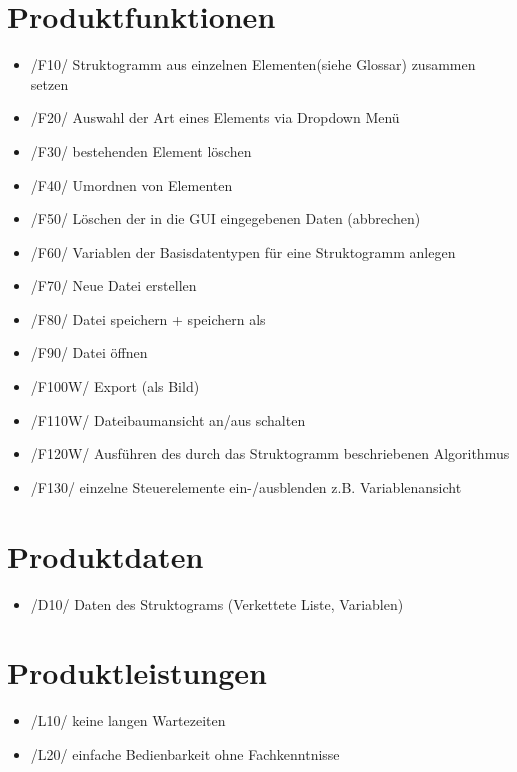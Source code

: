 \documentclass[a4paper,10pt]{report}
\begin{document}
\section{Produktfunktionen}
\begin{itemize}
\item /F10/ Struktogramm aus einzelnen Elementen(siehe Glossar) zusammen setzen
\item /F20/ Auswahl der Art eines Elements via Dropdown Menü
\item /F30/ bestehenden Element löschen
\item /F40/ Umordnen von Elementen
\item /F50/ Löschen der in die GUI eingegebenen Daten (abbrechen)
\item /F60/ Variablen der Basisdatentypen für eine Struktogramm anlegen
\item /F70/ Neue Datei erstellen
\item /F80/ Datei speichern + speichern als
\item /F90/ Datei öffnen
\item /F100W/ Export (als Bild)
\item /F110W/ Dateibaumansicht an/aus schalten
\item /F120W/ Ausführen des durch das Struktogramm beschriebenen Algorithmus
\item /F130/ einzelne Steuerelemente ein-/ausblenden z.B. Variablenansicht
\end{itemize}

\section{Produktdaten}
\begin{itemize}
\item /D10/ Daten des Struktograms (Verkettete Liste, Variablen)
\end{itemize}
\section{Produktleistungen}
\begin{itemize}
\item /L10/ keine langen Wartezeiten
\item /L20/ einfache Bedienbarkeit ohne Fachkenntnisse
\end{itemize}

\newpage
\end{document}
